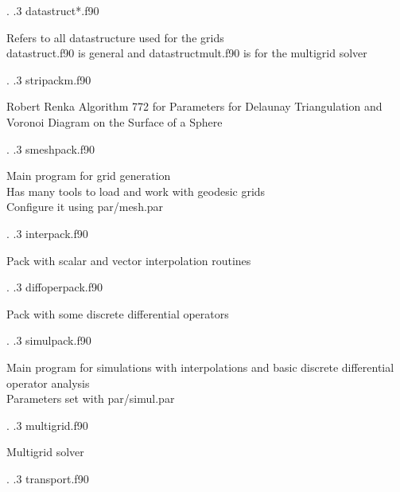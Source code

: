 \documentclass[a4paper,10pt]{article}
\begin{document}
{\begin{minipage}[t]{10cm}
	  \end{minipage}.
.3 datastruct*{.}f90 \hspace{1cm}  \begin{minipage}[t]{10cm}
          Refers to all datastructure used for the grids\\
	  datastruct{.}f90 is general and datastructmult{.}f90 is for the multigrid solver \\
	  \end{minipage}.
.3 stripackm{.}f90 \hspace{1cm}  \begin{minipage}[t]{10cm}
	    Robert Renka Algorithm 772 for Parameters for Delaunay Triangulation and Voronoi Diagram on the Surface of a Sphere\\
          \end{minipage}.
.3 smeshpack{.}f90 \hspace{1cm}  \begin{minipage}[t]{10cm}
          Main program for grid generation \\
	  Has many tools to load and work with geodesic grids\\
	  Configure it using par/mesh{.}par
	  \end{minipage}.
.3 interpack{.}f90 \hspace{1cm}  \begin{minipage}[t]{10cm}
          Pack with scalar and vector interpolation routines \\
	  \end{minipage}.
.3 diffoperpack{.}f90 \hspace{1cm}  \begin{minipage}[t]{10cm}
          Pack with some discrete differential operators\\
	  \end{minipage}.
.3 simulpack{.}f90 \hspace{1cm}  \begin{minipage}[t]{10cm}
          Main program for simulations with interpolations and basic discrete differential operator analysis\\
	  Parameters set with par/simul{.}par\\
	  \end{minipage}.
.3 multigrid{.}f90 \hspace{1cm}  \begin{minipage}[t]{10cm}
	    Multigrid solver\\
          \end{minipage}.
.3 transport{.}f90 \hspace{1cm}  \begin{minipage}[t]{10cm}

\end{minipage}}
\end{document}

